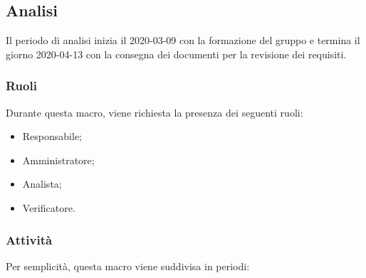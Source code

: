 \documentclass[../piano-di-progetto.tex]{subfiles}
\begin{document}
\subsection{Analisi}
Il periodo di analisi inizia il 2020-03-09 con la formazione del gruppo e termina il giorno 2020-04-13 con la consegna dei documenti per la revisione dei requisiti. 

\subsubsection{Ruoli}
Durante questa macro, viene richiesta la presenza dei seguenti ruoli:
\begin{itemize}
    \item Responsabile;
    \item Amministratore;
    \item Analista;
    \item Verificatore.
\end{itemize}

\subsubsection{Attività}
Per semplicità, questa macro viene suddivisa in periodi:
\end{document}
